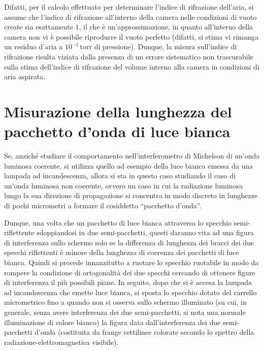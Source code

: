 \documentclass[a4paper,12pt]{article}
\begin{document}
Difatti, per il calcolo effettuato per determinare l’indice di rifrazione dell’aria, si assume che l’indice di rifrazione all’interno della camera nelle condizioni di vuoto create sia esattamente \( 1 \), il che è un’approssimazione, in quanto all’interno della camera non vi è possibile riprodurre il vuoto perfetto (difatti, si stima vi rimanga un residuo d’aria a \( 10^{-1} \, \text{torr} \) di pressione). Dunque, la misura sull’indice di rifrazione risulta viziata dalla presenza di un errore sistematico non trascurabile sulla stima dell’indice di rifrazione del volume interno alla camera in condizioni di aria aspirata.

\section{Misurazione della lunghezza del pacchetto d’onda di luce bianca}
Se, anziché studiare il comportamento nell’interferometro di Michelson di un’onda luminosa coerente, si utilizza quello ad esempio della luce bianca emessa da una lampada ad incandescenza, allora si sta in questo caso studiando il caso di un’onda luminosa non coerente, ovvero un caso in cui la radiazione luminosa lungo la sua direzione di propagazione si concentra in modo discreto in lunghezze di pochi micrometri a formare il cosiddetto “pacchetto d’onda”. 

Dunque, una volta che un pacchetto di luce bianca attraversa lo specchio semi-riflettente sdoppiandosi in due semi-pacchetti, questi daranno vita ad una figura di interferenza sullo schermo solo se la differenza di lunghezza dei bracci dei due specchi riflettenti è minore della lunghezza di coerenza dei pacchetti di luce bianca. 
Quindi si procede innanzitutto a ruotare lo specchio ruotabile in modo da rompere la condizione di ortogonalità dei due specchi cercando di ottenere figure di interferenza il più possibili piane. In seguito, dopo che si è accesa la lampada ad incandescenza che emette luce bianca, si sposta lo specchio dotato del carrello micrometrico fino a quando non si osserva sullo schermo illuminato (su cui, in generale, senza avere interferenza dei due semi-pacchetti, si nota una normale illuminazione di colore bianco) la figura data dall’interferenza dei due semi-pacchetti d’onda (costituita da frange rettilinee colorate secondo lo spettro della radiazione-elettromagnetica visibile). 
\end{document}
